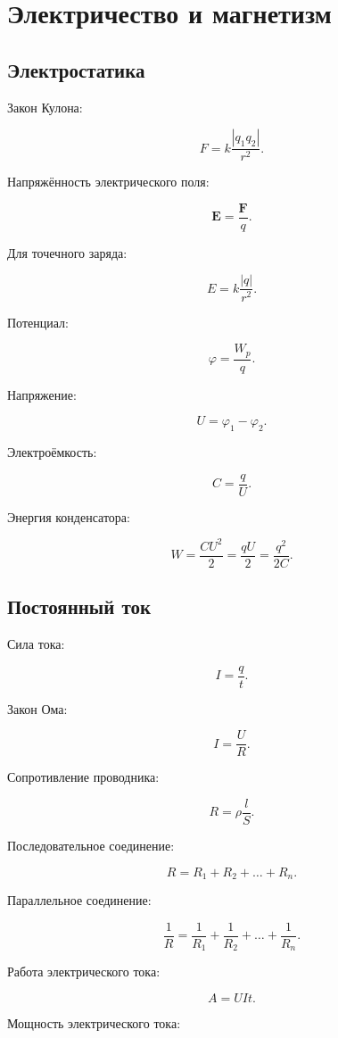 \documentclass[12pt,a4paper]{article}
\theoremstyle{definition}
\theoremstyle{remark}
\newcommand{\vect}[1]{\bm{#1}}
\newcommand{\abs}[1]{\left|#1\right|}
\begin{document}
\section{Электричество и магнетизм}

\subsection{Электростатика}

Закон Кулона:

\[
    F
    =
    k\frac{\abs{q_1q_2}}{r^2}.
\]

Напряжённость электрического поля:

\[
    \vect{E}
    =
    \frac{\vect{F}}{q}.
\]

Для точечного заряда:

\[
    E
    =
    k\frac{\abs{q}}{r^2}.
\]

Потенциал:

\[
    \varphi
    =
    \frac{W_p}{q}.
\]

Напряжение:

\[
    U=\varphi_1-\varphi_2.
\]

Электроёмкость:

\[
    C=\frac{q}{U}.
\]

Энергия конденсатора:

\[
    W
    =
    \frac{CU^2}{2}
    =
    \frac{qU}{2}
    =
    \frac{q^2}{2C}.
\]

\subsection{Постоянный ток}

Сила тока:

\[
    I=\frac{q}{t}.
\]

Закон Ома:

\[
    I=\frac{U}{R}.
\]

Сопротивление проводника:

\[
    R=\rho\frac{l}{S}.
\]

Последовательное соединение:

\[
    R=R_1+R_2+\dots+R_n.
\]

Параллельное соединение:

\[
    \frac{1}{R}
    =
    \frac{1}{R_1}
    +
    \frac{1}{R_2}
    +
    \dots
    +
    \frac{1}{R_n}.
\]

Работа электрического тока:

\[
    A=UIt.
\]

Мощность электрического тока:
\end{document}
